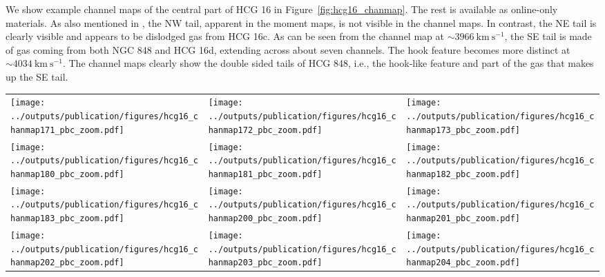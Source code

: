 \documentclass{aa}
\begin{document}
 We show example channel maps of the central part of HCG 16 in Figure~\ref{fig:hcg16_chanmap}. The rest is available as online-only materials. 
 As also mentioned in \citet{2019A&A...632A..78J}, the NW tail, apparent in the moment maps, is not visible in the channel maps. In contrast, 
 the NE tail is clearly visible and appears to be dislodged gas from HCG 16c. 
 As can be seen from the channel map at $\mathrm{\sim 3966~km~s^{-1}}$, the SE tail is made of gas coming from both NGC 848 and HCG 16d, 
 extending across about seven channels. 
 The hook feature becomes more distinct at $\mathrm{\sim 4034~km~s^{-1}}$. The channel maps clearly show the double sided tails of 
 HCG 848, i.e., the hook-like feature and part of the gas that makes up the SE tail.  
 
 \begin{figure*}
 \setlength{\tabcolsep}{0pt}
 \begin{tabular}{l l l}
     \texttt{[image: ../outputs/publication/figures/hcg16\_chanmap171\_pbc\_zoom.pdf]} &
     \texttt{[image: ../outputs/publication/figures/hcg16\_chanmap172\_pbc\_zoom.pdf]} &
     \texttt{[image: ../outputs/publication/figures/hcg16\_chanmap173\_pbc\_zoom.pdf]} \\[-0.2cm]
     \texttt{[image: ../outputs/publication/figures/hcg16\_chanmap180\_pbc\_zoom.pdf]} &
     \texttt{[image: ../outputs/publication/figures/hcg16\_chanmap181\_pbc\_zoom.pdf]} &
     \texttt{[image: ../outputs/publication/figures/hcg16\_chanmap182\_pbc\_zoom.pdf]} \\[-0.2cm]
     \texttt{[image: ../outputs/publication/figures/hcg16\_chanmap183\_pbc\_zoom.pdf]} &
     \texttt{[image: ../outputs/publication/figures/hcg16\_chanmap200\_pbc\_zoom.pdf]} &
     \texttt{[image: ../outputs/publication/figures/hcg16\_chanmap201\_pbc\_zoom.pdf]} \\[-0.2cm] 
     \texttt{[image: ../outputs/publication/figures/hcg16\_chanmap202\_pbc\_zoom.pdf]}& 
     \texttt{[image: ../outputs/publication/figures/hcg16\_chanmap203\_pbc\_zoom.pdf]}&
     \texttt{[image: ../outputs/publication/figures/hcg16\_chanmap204\_pbc\_zoom.pdf]}
   \end{tabular}
	 \caption{Example channel maps of the primary-beam corrected cube of HCG 16 overlaid on DECaLS DR10 R-band optical images. Contour 
   levels are (1.5, 2, 2.5, 3,  4, 8, 16, 32) times the median noise level in the cube (0.58 $\mathrm{mJy~beam^{-1}}$). 
   The blue colors show contour levels below 3$\sigma$; the red colors represent contour levels at 3$\sigma$, or higher. }
   \label{fig:hcg16_chanmap}
  \end{figure*}
\end{document}

